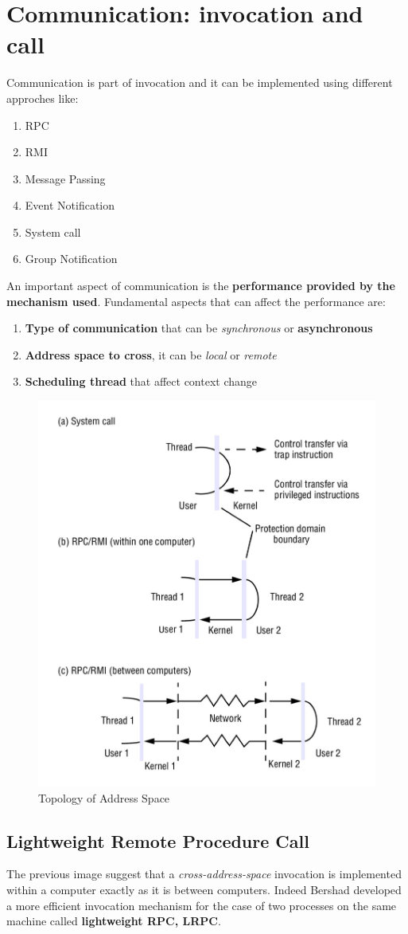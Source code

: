 \section{Communication: invocation and call}
Communication is part of invocation and it can be implemented using different approches like:
\begin{enumerate}
    \item RPC
    \item RMI
    \item Message Passing
    \item Event Notification 
    \item System call
    \item Group Notification
\end{enumerate}
An important aspect of communication is the \textbf{performance provided by the mechanism used}. Fundamental aspects that can affect the performance are:
\begin{enumerate}
    \item \textbf{Type of communication} that can be \textit{synchronous} or \textbf{asynchronous}
    \item \textbf{Address space to cross}, it can be \textit{local} or \textit{remote}
    \item \textbf{Scheduling thread} that affect context change 
\end{enumerate}

\begin{figure}[!h]
    \centering
    \includegraphics[width=.5\linewidth]{images/OperatingSystemSupport/topologyOfAddressSpace.jpeg}
    \caption{Topology of Address Space}
\end{figure}

\subsection{Lightweight Remote Procedure Call}
The previous image suggest that a \textit{cross-address-space} invocation is implemented within a computer exactly as it is between computers. Indeed Bershad developed a more efficient invocation mechanism for the case of two processes on the same machine called \textbf{lightweight RPC, LRPC}.

